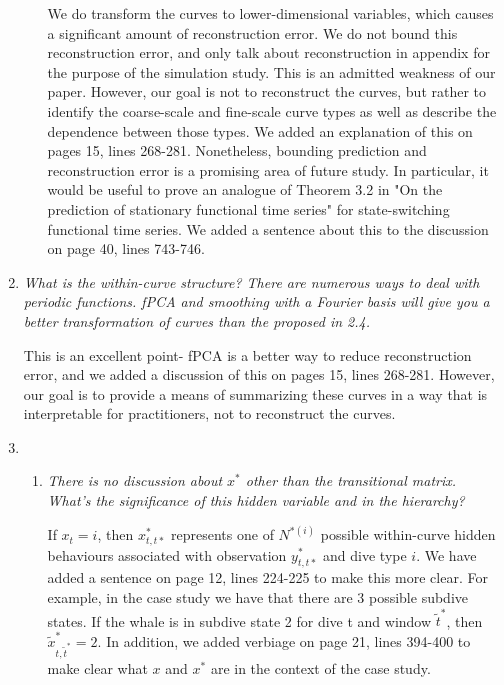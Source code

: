 \documentclass{article}
\begin{document}
\begin{enumerate}
\begin{enumerate}
        We do transform the curves to lower-dimensional variables, which causes a significant amount of reconstruction error. We do not bound this reconstruction error, and only talk about reconstruction in appendix for the purpose of the simulation study. This is an admitted weakness of our paper. However, our goal is not to reconstruct the curves, but rather to identify the coarse-scale and fine-scale curve types as well as describe the dependence between those types. We added an explanation of this on pages 15, lines 268-281. Nonetheless, bounding prediction and reconstruction error is a promising area of future study. In particular, it would be useful to prove an analogue of Theorem 3.2 in "On the prediction of stationary functional time series" for state-switching functional time series. We added a sentence about this to the discussion on page 40, lines 743-746.
        
    \end{enumerate}
    
    \item \textit{What is the within-curve structure? There are numerous ways to deal with periodic functions. fPCA and smoothing with a Fourier basis will give you a better transformation of curves than the proposed in 2.4.} 
    
    This is an excellent point- fPCA is a better way to reduce reconstruction error, and we added a discussion of this on pages 15, lines 268-281. However, our goal is to provide a means of summarizing these curves in a way that is interpretable for practitioners, not to reconstruct the curves.
    
    \item \begin{enumerate}
        \item \textit{There is no discussion about $x^*$ other than the transitional matrix. What's the significance of this hidden variable and in the hierarchy?} 
        
        If $x_t = i$, then $x_{t,t*}^*$ represents one of $N^{*(i)}$ possible within-curve hidden behaviours associated with observation $y_{t,t*}^*$ and dive type $i$. We have added a sentence on page 12, lines 224-225 to make this more clear. For example, in the case study we have that there are 3 possible subdive states. If the whale is in subdive state 2 for dive t and window $\tilde t^*$, then $\tilde x^*_{t,\tilde t^*} = 2$.  In addition, we added verbiage on page 21, lines 394-400 to make clear what $x$ and $x^*$ are in the context of the case study. 
        

\end{enumerate}
\end{enumerate}
\end{document}
